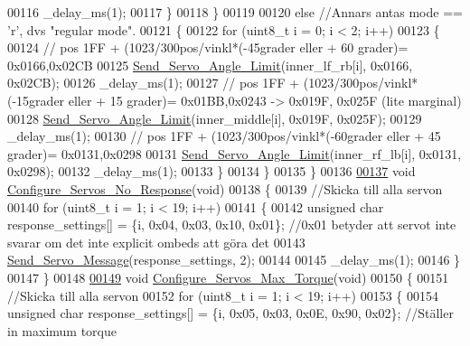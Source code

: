 \begin{DoxyCode}
00116             \_delay\_ms(1);
00117         \}
00118     \}
00119     
00120     \textcolor{keywordflow}{else} \textcolor{comment}{//Annars antas mode == 'r', dvs "regular mode".}
00121     \{
00122         \textcolor{keywordflow}{for} (uint8\_t i = 0; i < 2; i++)
00123         \{
00124             \textcolor{comment}{// pos 1FF + (1023/300pos/vinkl*(-45grader eller + 60 grader)= 0x0166,0x02CB}
00125             \hyperlink{servo___u_a_r_t_8c_aae1b10368951b07e7049392da8e8160b}{Send\_Servo\_Angle\_Limit}(inner\_lf\_rb[i], 0x0166, 0x02CB);  
00126             \_delay\_ms(1);
00127             \textcolor{comment}{// pos 1FF + (1023/300pos/vinkl*(-15grader eller + 15 grader)= 0x01BB,0x0243 -> 0x019F, 0x025F
       (lite marginal)}
00128             \hyperlink{servo___u_a_r_t_8c_aae1b10368951b07e7049392da8e8160b}{Send\_Servo\_Angle\_Limit}(inner\_middle[i], 0x019F, 0x025F); 
00129             \_delay\_ms(1);
00130             \textcolor{comment}{// pos 1FF + (1023/300pos/vinkl*(-60grader eller + 45 grader)= 0x0131,0x0298}
00131             \hyperlink{servo___u_a_r_t_8c_aae1b10368951b07e7049392da8e8160b}{Send\_Servo\_Angle\_Limit}(inner\_rf\_lb[i], 0x0131, 0x0298); 
00132             \_delay\_ms(1);
00133         \}
00134     \}
00135 \}
00136 
\hypertarget{servo___u_a_r_t_8c_source.tex_l00137}{}\hyperlink{servo___u_a_r_t_8h_a17e89f3d8b4abe3abe352ffba8b684f1}{00137} \textcolor{keywordtype}{void} \hyperlink{servo___u_a_r_t_8c_a17e89f3d8b4abe3abe352ffba8b684f1}{Configure\_Servos\_No\_Response}(\textcolor{keywordtype}{void})
00138 \{
00139     \textcolor{comment}{//Skicka till alla servon}
00140     \textcolor{keywordflow}{for} (uint8\_t i = 1; i < 19; i++)
00141     \{
00142         \textcolor{keywordtype}{unsigned} \textcolor{keywordtype}{char} response\_settings[] = \{i, 0x04, 0x03, 0x10, 0x01\}; \textcolor{comment}{//0x01 betyder att servot inte
       svarar om det inte explicit ombeds att göra det}
00143         \hyperlink{servo___u_a_r_t_8c_a2ed3a2903977a774d1b174665d50661c}{Send\_Servo\_Message}(response\_settings, 2);
00144         
00145         \_delay\_ms(1);
00146     \}
00147 \}
00148 
\hypertarget{servo___u_a_r_t_8c_source.tex_l00149}{}\hyperlink{servo___u_a_r_t_8h_a2f788735cafd686c547c9340d905c3ad}{00149} \textcolor{keywordtype}{void} \hyperlink{servo___u_a_r_t_8c_a2f788735cafd686c547c9340d905c3ad}{Configure\_Servos\_Max\_Torque}(\textcolor{keywordtype}{void})
00150 \{
00151     \textcolor{comment}{//Skicka till alla servon}
00152     \textcolor{keywordflow}{for} (uint8\_t i = 1; i < 19; i++)
00153     \{
00154         \textcolor{keywordtype}{unsigned} \textcolor{keywordtype}{char} response\_settings[] = \{i, 0x05, 0x03, 0x0E, 0x90, 0x02\}; \textcolor{comment}{//Ställer in maximum torque
}
\end{DoxyCode}
